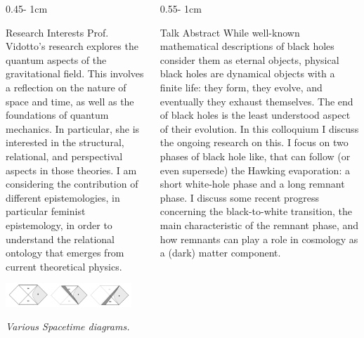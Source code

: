 \documentclass{../psuposter}
\begin{document}
\begin{frame}
\begin{columns}[t, totalwidth=\textwidth]
\begin{column}{0.45\textwidth - 1cm}
    \begin{block}{Research Interests}
        Prof. Vidotto's research explores the quantum aspects of the gravitational field. This involves a reflection on the nature of space and time, as well as the foundations of quantum mechanics. In particular, she is interested in the structural, relational, and perspectival aspects in those theories. I am considering the contribution of different epistemologies, in particular feminist epistemology, in order to understand the relational ontology that emerges from current theoretical physics. 
        \begin{center}
	    	\includegraphics[width=0.9\textwidth]{images/research}    		

    	\textit{Various Spacetime diagrams. \cite{rovelliWhiteholeDarkMatter2018}} 
    	\end{center}

    \end{block}
\end{column}
\begin{column}{0.55\textwidth - 1cm}


    \begin{block}{Talk Abstract}
    	While well-known mathematical descriptions of black holes consider them as eternal objects, physical black holes are dynamical objects with a finite life: they form, they evolve, and eventually they exhaust themselves. The end of black holes is the least understood aspect of their evolution. In this colloquium I discuss the ongoing research on this. I focus on two phases of black hole like, that can follow (or even supersede) the Hawking evaporation: a short white-hole phase and a long remnant phase. I discuss some recent progress concerning the black-to-white transition, the main characteristic of the remnant phase, and how remnants can play a role in cosmology as a (dark) matter component.
    \end{block}



\end{column}
\end{columns}
\end{frame}
\end{document}
